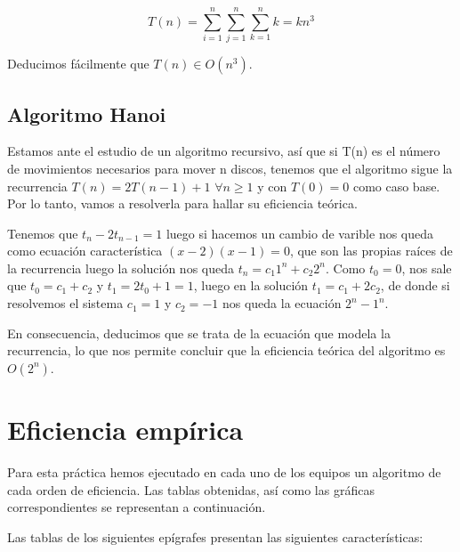\documentclass{homework}
\begin{document}
    \begin{equation*}
        T(n) = \sum_{i=1}^n \sum_{j=1}^{n} \sum_{k=1}^{n} k = kn^3
    \end{equation*}

    Deducimos fácilmente que $T(n) \in O(n^3)$. 
    
    \vspace{2em}

    \subsection{Algoritmo Hanoi}
    
     

    Estamos ante el estudio de un algoritmo recursivo, así que si T(n) es el número de movimientos necesarios para mover n discos, tenemos que el algoritmo sigue la 
    recurrencia $T(n) = 2T(n-1) + 1$ $\forall n \geq 1$ y con $T(0) = 0$ como caso base. Por lo tanto, vamos a resolverla para hallar su eficiencia teórica.

    Tenemos que $t_n - 2t_{n-1} = 1 $ luego si hacemos un cambio de varible nos queda como ecuación característica $(x-2)(x-1) = 0$, que son las propias raíces de la 
    recurrencia luego la solución nos queda $t_n = c_1 1^n  + c_2 2^n  $. Como $t_0=0$, nos sale que $t_0 = c_1 + c_2$ y $t_1 = 2 t_0 + 1 = 1$, luego en la 
    solución $t_1=c_1 + 2 c_2 $, de donde si resolvemos el sistema $c_1 = 1$ y $c_2 = -1$ nos queda la ecuación $2^n - 1^n$. 
    
    En consecuencia, deducimos que se trata de la ecuación que 
    modela la recurrencia, lo que nos permite concluir que la eficiencia teórica del algoritmo es $O(2^n)$.

    \newpage
    \section{Eficiencia empírica}

    Para esta práctica hemos ejecutado en cada uno de los equipos un algoritmo de cada orden de eficiencia.
    Las tablas obtenidas, así como las gráficas correspondientes se representan a continuación.

    Las tablas de los siguientes epígrafes presentan las siguientes características:
\end{document}
